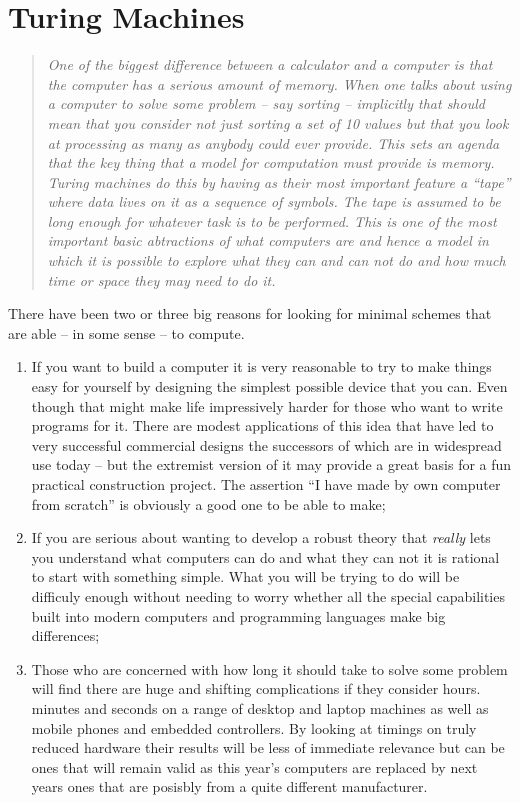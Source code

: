 \section{Turing Machines}
\begin{quotation}\textit{
One of the biggest difference between a calculator and a computer is that
the computer has a serious amount of memory. When one talks about using a
computer to solve some problem -- say sorting -- implicitly that should
mean that you consider not just sorting a set of 10 values but that
you look at processing as many as anybody could ever provide. This
sets an agenda that the key thing that a model for computation must
provide is memory. Turing machines do this by having as their most
important feature a ``tape'' where data lives on it as a sequence of
symbols. The tape is assumed to be long enough for whatever task is to
be performed. This is one of the most important basic abtractions
of what computers are and hence a model in which it is possible to
explore what they can and can not do and how much time or space
they may need to do it.
}\end{quotation}
There have been two or three big reasons for looking for minimal
schemes that are able -- in some sense -- to compute.
\begin{enumerate}
\item If you want to build a computer it is very reasonable to try to
make things easy for yourself by designing the simplest possible device
that you can. Even though that might make life impressively harder for
those who want to write programs for it. There are modest applications
of this idea that have led to very successful commercial designs the
successors of which are in widespread use today -- but the extremist
version of it may provide a great basis for a fun practical construction
project. The assertion ``I have made by own computer from scratch'' is
obviously a good one to be able to make;
\item If you are serious about wanting to develop a robust theory that
{\em really} lets you understand what computers can do and what they can
not it is rational to start with something simple. What you will be
trying to do will be difficuly enough without needing to worry whether
all the special capabilities built into modern computers and programming
languages make big differences;
\item Those who are concerned with how long it should take to solve some
problem will find there are huge and shifting complications if they
consider hours. minutes and seconds on a range of desktop and laptop
machines as well as mobile phones and embedded controllers. By looking
at timings on truly reduced hardware their results will be less of immediate
relevance but can be ones that will remain valid as this year's
computers are replaced by next years ones that are posisbly from a quite
different manufacturer.
\end{enumerate}

